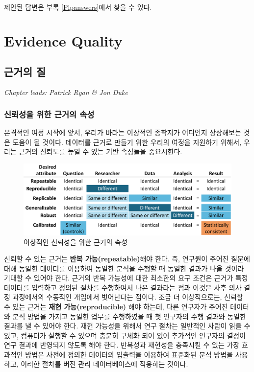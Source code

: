 \documentclass[11pt]{book}
\theoremstyle{definition}
\theoremstyle{definition}
\theoremstyle{definition}
\theoremstyle{remark}
\begin{document}
제안된 답변은 부록 \ref{Plpanswers}에서 찾을 수 있다.

\part{Evidence Quality}\label{part-evidence-quality}

\chapter{근거의 질}\label{EvidenceQuality}

\emph{Chapter leads: Patrick Ryan \& Jon Duke}


\section{신뢰성을 위한 근거의 속성}\label{---}

본격적인 여정 시작에 앞서, 우리가 바라는 이상적인 종착지가 어디인지
상상해보는 것은 도움이 될 것이다. 데이터를 근거로 만들기 위한 우리의
여정을 지원하기 위해서, 우리는 근거의 신뢰도를 높일 수 있는 기반
속성들을 중요시한다.

\begin{figure}

{\centering \includegraphics[width=1\linewidth]{images/EvidenceQuality/reliableevidenceattributes} 

}

\caption{이상적인 신뢰성을 위한 근거의 속성}\label{fig:attributesOfEvidence}
\end{figure}

신뢰할 수 있는 근거는 \textbf{반복 가능(repeatable)}해야 한다. 즉,
연구원이 주어진 질문에 대해 동일한 데이터를 이용하여 동일한 분석을
수행할 때 동일한 결과가 나올 것이라 기대할 수 있어야 한다. 근거의 반복
가능성에 대한 최소한의 요구 조건은 근거가 특정 데이터를 입력하고 정의된
절차를 수행하여서 나온 결과라는 점과 이것은 사후 의사 결정 과정에서의
수동적인 개입에서 벗어난다는 점이다. 조금 더 이상적으로는, 신뢰할 수
있는 근거는 \textbf{재현 가능(reproducible)} 해야 하는데, 다른 연구자가
주어진 데이터와 분석 방법을 가지고 동일한 업무를 수행하였을 때 첫
연구자의 수행 결과와 동일한 결과를 낼 수 있어야 한다. 재현 가능성을
위해서 연구 절차는 일반적인 사람이 읽을 수 있고, 컴퓨터가 실행할 수
있으며 충분히 구체화 되어 있어 추가적인 연구자의 결정이 연구 결과에
반영되지 않도록 해야 한다. 반복성과 재현성을 충족시킬 수 있는 가장
효과적인 방법은 사전에 정의한 데이터의 입출력을 이용하여 표준화된 분석
방법을 사용하고, 이러한 절차를 버전 관리 데이터베이스에 적용하는 것이다.
\end{document}

